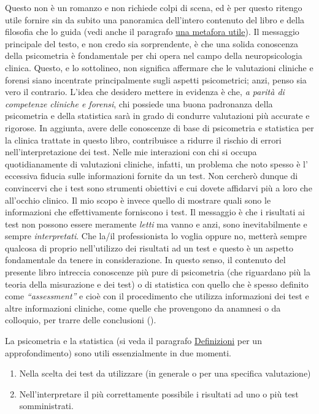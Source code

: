 \documentclass[
  italian,
  letterpaper,
  paper=A4,
  headinclude=on,
  footinclude=on,
  12pt]{scrbook}
\providecommand{\tightlist}{%
  \setlength{\itemsep}{0pt}\setlength{\parskip}{0pt}}
\begin{document}
Questo non è un romanzo e non richiede colpi di scena, ed è per questo
ritengo utile fornire sin da subito una panoramica dell'intero contenuto
del libro e della filosofia che lo guida (vedi anche il paragrafo
\hyperref[una-metafora-utile]{una metafora utile}). Il messaggio
principale del testo, e non credo sia sorprendente, è che una solida
conoscenza della psicometria è fondamentale per chi opera nel campo
della neuropsicologia clinica. Questo, e lo sottolineo, non significa
affermare che le valutazioni cliniche e forensi siano incentrate
principalmente sugli aspetti psicometrici; anzi, penso sia vero il
contrario. L'idea che desidero mettere in evidenza è che, \emph{a parità
di competenze cliniche e forensi}, chi possiede una buona padronanza
della psicometria e della statistica sarà in grado di condurre
valutazioni più accurate e rigorose. In aggiunta, avere delle conoscenze
di base di psicometria e statistica per la clinica trattate in questo
libro, contribuisce a ridurre il rischio di errori nell'interpretazione
dei test. Nelle mie interazioni con chi si occupa quotidianamente di
valutazioni cliniche, infatti, un problema che noto spesso è l'
eccessiva fiducia sulle informazioni fornite da un test. Non cercherò
dunque di convincervi che i test sono strumenti obiettivi e cui dovete
affidarvi più a loro che all'occhio clinico. Il mio scopo è invece
quello di mostrare quali sono le informazioni che effettivamente
forniscono i test. Il messaggio è che i risultati ai test non possono
essere meramente \emph{letti} ma vanno e anzi, sono inevitabilmente e
sempre \emph{interpretati}. Che la/il professionista lo voglia oppure
no, metterà sempre qualcosa di proprio nell'utilizzo dei risultati ad un
test e questo è un aspetto fondamentale da tenere in considerazione. In
questo senso, il contenuto del presente libro intreccia conoscenze più
pure di psicometria (che riguardano più la teoria della misurazione e
dei test) o di statistica con quello che è spesso definito come
\emph{``assessment''} e cioè con il procedimento che utilizza
informazioni dei test e altre informazioni cliniche, come quelle che
provengono da anamnesi o da colloquio, per trarre delle conclusioni
(\cite{chiorri2023teoria}).

La psicometria e la statistica (si veda il paragrafo
\hyperref[Definizioni]{Definizioni} per un approfondimento) sono utili
essenzialmente in due momenti.

\begin{enumerate}
\def\labelenumi{\arabic{enumi}.}
\tightlist
\item
  Nella scelta dei test da utilizzare (in generale o per una specifica
  valutazione)
\item
  Nell'interpretare il più correttamente possibile i risultati ad uno o
  più test somministrati.
\end{enumerate}
\end{document}
